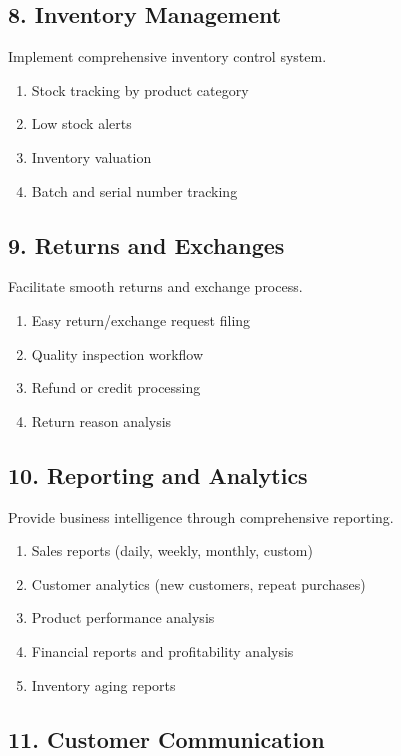 \documentclass[12pt,a4paper]{report}
\begin{document}
\subsection{8. Inventory Management}

Implement comprehensive inventory control system.

\begin{enumerate}[label=\roman*)]
    \item Stock tracking by product category
    \item Low stock alerts
    \item Inventory valuation
    \item Batch and serial number tracking
\end{enumerate}

\subsection{9. Returns and Exchanges}

Facilitate smooth returns and exchange process.

\begin{enumerate}[label=\roman*)]
    \item Easy return/exchange request filing
    \item Quality inspection workflow
    \item Refund or credit processing
    \item Return reason analysis
\end{enumerate}

\subsection{10. Reporting and Analytics}

Provide business intelligence through comprehensive reporting.

\begin{enumerate}[label=\roman*)]
    \item Sales reports (daily, weekly, monthly, custom)
    \item Customer analytics (new customers, repeat purchases)
    \item Product performance analysis
    \item Financial reports and profitability analysis
    \item Inventory aging reports
\end{enumerate}

\subsection{11. Customer Communication}
\end{document}
